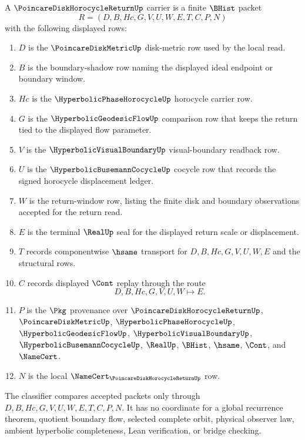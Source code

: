 \begin{definition}
\label{def:poincare-disk-horocycle-return-carrier}
A $\PoincareDiskHorocycleReturnUp$ carrier is a finite $\BHist$ packet
$$
R=(D,B,Hc,G,V,U,W,E,T,C,P,N)
$$
with the following displayed rows:
\begin{enumerate}
\item $D$ is the $\PoincareDiskMetricUp$ disk-metric row used by the local read.
\item $B$ is the boundary-shadow row naming the displayed ideal endpoint or boundary window.
\item $Hc$ is the $\HyperbolicPhaseHorocycleUp$ horocycle carrier row.
\item $G$ is the $\HyperbolicGeodesicFlowUp$ comparison row that keeps the return tied to the displayed flow parameter.
\item $V$ is the $\HyperbolicVisualBoundaryUp$ visual-boundary readback row.
\item $U$ is the $\HyperbolicBusemannCocycleUp$ cocycle row that records the signed horocycle displacement ledger.
\item $W$ is the return-window row, listing the finite disk and boundary observations accepted for the return read.
\item $E$ is the terminal $\RealUp$ seal for the displayed return scale or displacement.
\item $T$ records componentwise $\hsame$ transport for $D,B,Hc,G,V,U,W,E$ and the structural rows.
\item $C$ records displayed $\Cont$ replay through the route
$$
D,B,Hc,G,V,U,W \longmapsto E .
$$
\item $P$ is the $\Pkg$ provenance over $\PoincareDiskHorocycleReturnUp$, $\PoincareDiskMetricUp$, $\HyperbolicPhaseHorocycleUp$, $\HyperbolicGeodesicFlowUp$, $\HyperbolicVisualBoundaryUp$, $\HyperbolicBusemannCocycleUp$, $\RealUp$, $\BHist$, $\hsame$, $\Cont$, and $\NameCert$.
\item $N$ is the local $\NameCert_{\PoincareDiskHorocycleReturnUp}$ row.
\end{enumerate}
The classifier compares accepted packets only through $D,B,Hc,G,V,U,W,E,T,C,P,N$. It has no coordinate for a global recurrence theorem, quotient boundary flow, selected complete orbit, physical observer law, ambient hyperbolic completeness, Lean verification, or bridge checking.
\end{definition}

